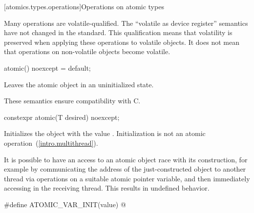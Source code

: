 [atomics.types.operations]{Operations on atomic types}

\pnum
\begin{note} Many operations are volatile-qualified. The ``volatile as device register''
semantics have not changed in the standard. This qualification means that volatility is
preserved when applying these operations to volatile objects. It does not mean that
operations on non-volatile objects become volatile. \end{note}

%
%
%
\begin{itemdecl}
atomic() noexcept = default;
\end{itemdecl}

\begin{itemdescr}
\pnum
\effects
Leaves the atomic object in an uninitialized state.
\begin{note}
These semantics ensure compatibility with C.
\end{note}
\end{itemdescr}

%
%
%
\begin{itemdecl}
constexpr atomic(T desired) noexcept;
\end{itemdecl}

\begin{itemdescr}
\pnum
\effects Initializes the object with the value .
Initialization is not an atomic operation~(\ref{intro.multithread}).
\begin{note} It is possible to have an access to an atomic object 
race with its construction, for example by communicating the address of the
just-constructed object  to another thread via
 operations on a suitable atomic pointer
variable, and then immediately accessing  in the receiving thread.
This results in undefined behavior. \end{note}
\end{itemdescr}

%
\begin{itemdecl}
#define ATOMIC_VAR_INIT(value) @\seebelow@
\end{itemdecl}

